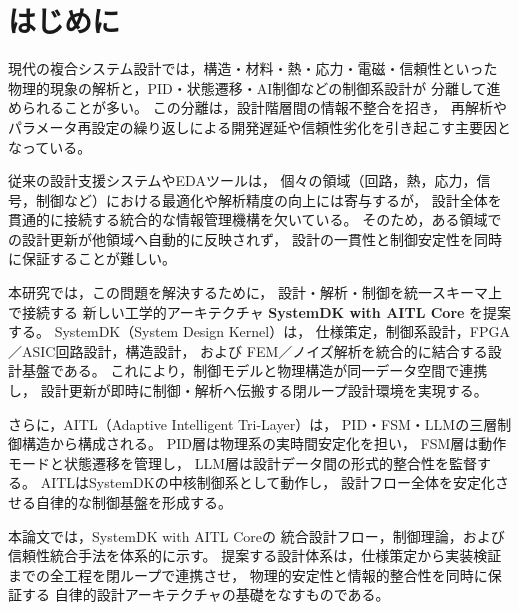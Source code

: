 \section{はじめに}

現代の複合システム設計では，構造・材料・熱・応力・電磁・信頼性といった
物理的現象の解析と，PID・状態遷移・AI制御などの制御系設計が
分離して進められることが多い。
この分離は，設計階層間の情報不整合を招き，
再解析やパラメータ再設定の繰り返しによる開発遅延や信頼性劣化を引き起こす主要因となっている。

従来の設計支援システムやEDAツールは，
個々の領域（回路，熱，応力，信号，制御など）における最適化や解析精度の向上には寄与するが，
設計全体を貫通的に接続する統合的な情報管理機構を欠いている。
そのため，ある領域での設計更新が他領域へ自動的に反映されず，
設計の一貫性と制御安定性を同時に保証することが難しい。

本研究では，この問題を解決するために，
設計・解析・制御を統一スキーマ上で接続する
新しい工学的アーキテクチャ \textbf{SystemDK with AITL Core} を提案する。
SystemDK（System Design Kernel）は，
仕様策定，制御系設計，FPGA／ASIC回路設計，構造設計，
および FEM／ノイズ解析を統合的に結合する設計基盤である。
これにより，制御モデルと物理構造が同一データ空間で連携し，
設計更新が即時に制御・解析へ伝搬する閉ループ設計環境を実現する。

さらに，AITL（Adaptive Intelligent Tri-Layer）は，
PID・FSM・LLMの三層制御構造から構成される。
PID層は物理系の実時間安定化を担い，
FSM層は動作モードと状態遷移を管理し，
LLM層は設計データ間の形式的整合性を監督する。
AITLはSystemDKの中核制御系として動作し，
設計フロー全体を安定化させる自律的な制御基盤を形成する。

本論文では，SystemDK with AITL Coreの
統合設計フロー，制御理論，および信頼性統合手法を体系的に示す。
提案する設計体系は，仕様策定から実装検証までの全工程を閉ループで連携させ，
物理的安定性と情報的整合性を同時に保証する
自律的設計アーキテクチャの基礎をなすものである。
